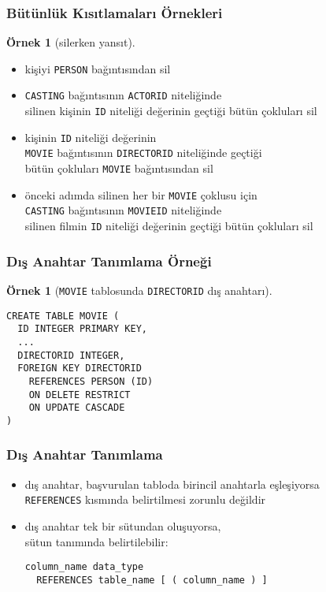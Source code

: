 \documentclass[dvipsnames]{beamer}
\theoremstyle{definition}
\theoremstyle{example}
\newtheorem{ornek}[theorem]{Örnek}
\theoremstyle{plain}
\begin{document}
\begin{frame}[fragile]
  \frametitle{Bütünlük Kısıtlamaları Örnekleri}

  \begin{ornek}[silerken yansıt]
    \begin{itemize}
      \item kişiyi \texttt{PERSON} bağıntısından sil

      \pause
      \item \texttt{CASTING} bağıntısının \texttt{ACTORID} niteliğinde\\
        silinen kişinin \texttt{ID} niteliği değerinin geçtiği bütün çokluları
        sil

      \pause
      \item kişinin \texttt{ID} niteliği değerinin\\
        \texttt{MOVIE} bağıntısının \texttt{DIRECTORID} niteliğinde geçtiği\\
        bütün çokluları \texttt{MOVIE} bağıntısından sil

      \pause
      \item önceki adımda silinen her bir \texttt{MOVIE} çoklusu için\\
        \texttt{CASTING} bağıntısının \texttt{MOVIEID} niteliğinde\\
        silinen filmin \texttt{ID} niteliği değerinin geçtiği bütün çokluları sil
    \end{itemize}
  \end{ornek}
\end{frame}

\begin{frame}[fragile]
  \frametitle{Dış Anahtar Tanımlama Örneği}

  \begin{ornek}[\texttt{MOVIE} tablosunda \texttt{DIRECTORID} dış anahtarı]
    \begin{lstlisting}
CREATE TABLE MOVIE (
  ID INTEGER PRIMARY KEY,
  ...
  DIRECTORID INTEGER,
  FOREIGN KEY DIRECTORID
    REFERENCES PERSON (ID)
    ON DELETE RESTRICT
    ON UPDATE CASCADE
)
    \end{lstlisting}
  \end{ornek}
\end{frame}

\begin{frame}[fragile]
  \frametitle{Dış Anahtar Tanımlama}

  \begin{itemize}
    \item dış anahtar, başvurulan tabloda birincil anahtarla eşleşiyorsa\\
      \texttt{REFERENCES} kısmında belirtilmesi zorunlu değildir

    \pause
    \medskip
    \item dış anahtar tek bir sütundan oluşuyorsa,\\
      sütun tanımında belirtilebilir:
    \begin{lstlisting}
column_name data_type
  REFERENCES table_name [ ( column_name ) ]
    \end{lstlisting}
  \end{itemize}
\end{frame}
\end{document}
